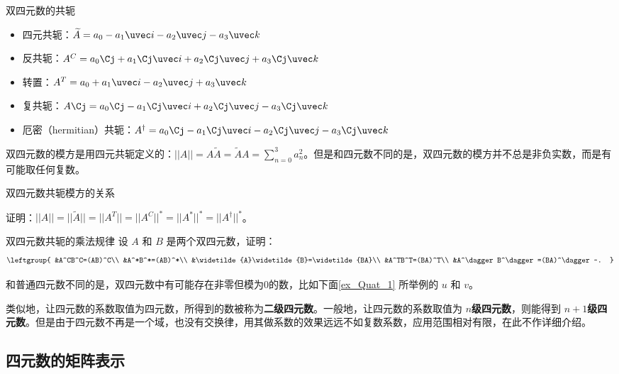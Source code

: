 \begin{definition}{双四元数的共轭}
\begin{itemize}
\item 四元共轭：$\widetilde{A}=a_0-a_1\uvec i-a_2\uvec j-a_3\uvec k$
\item 反共轭：$A^C=a_0\Cj + a_1\Cj\uvec i+a_2\Cj\uvec j+a_3\Cj\uvec k$
\item 转置：$A^T=a_0+a_1\uvec i-a_2\uvec j+a_3\uvec k$
\item 复共轭：$A\Cj=a_0\Cj-a_1\Cj\uvec i+a_2\Cj\uvec j-a_3\Cj\uvec k$
\item 厄密（hermitian）共轭：$A^\dagger=a_0\Cj-a_1\Cj\uvec i-a_2\Cj\uvec j-a_3\Cj\uvec k$
\end{itemize}
\end{definition}

双四元数的模方是用四元共轭定义的：$||A||=A\widetilde{A}=\widetilde{A}A=\sum^{3}_{n=0}a^2_n$。但是和四元数不同的是，双四元数的模方并不总是非负实数，而是有可能取任何复数。

\begin{exercise}{双四元数共轭模方的关系}

证明：$||A||=||\widetilde{A}||=||A^T||=||A^C||^*=||A^*||^*=||A^\dagger||^*$。

\end{exercise}

\begin{exercise}{双四元数共轭的乘法规律}
设 $A$ 和 $B$ 是两个双四元数，证明：
\begin{equation}
\leftgroup{
&A^CB^C=(AB)^C\\
&A^*B^*=(AB)^*\\
&\widetilde{A}\widetilde{B}=\widetilde{BA}\\
&A^TB^T=(BA)^T\\
&A^\dagger B^\dagger=(BA)^\dagger~.
}
\end{equation}

\end{exercise}

和普通四元数不同的是，双四元数中有可能存在非零但模为0的数，比如下面\autoref{ex_Quat_1} 所举例的 $u$ 和 $v$。

类似地，让四元数的系数取值为四元数，所得到的数被称为\textbf{二级四元数}。一般地，让四元数的系数取值为 $n$\textbf{级四元数}，则能得到 $n+1$\textbf{级四元数}。但是由于四元数不再是一个域，也没有交换律，用其做系数的效果远远不如复数系数，应用范围相对有限，在此不作详细介绍。


\subsection{四元数的矩阵表示}

